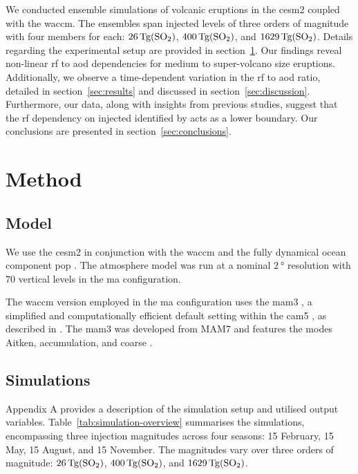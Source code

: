 \documentclass{ametsocV6.1}
\newcommand{\iso}[1][i]{{#1}njected \ce{SO2}}
\begin{document}
We conducted ensemble simulations of volcanic eruptions in the \gls{cesm2} coupled with
the \gls{waccm}. The ensembles span \iso{} levels of three orders of magnitude with four
members for each: \(\SI{26}{\tera\gram(\ce{SO2})}\), \(\SI{400}{\tera\gram(\ce{SO2})}\),
and \(\SI{1629}{\tera\gram(\ce{SO2})}\). Details regarding the experimental setup are
provided in section~\ref{sec:method}. Our findings reveal non-linear \gls{rf} to
\gls{aod} dependencies for medium to super-volcano size eruptions. Additionally, we
observe a time-dependent variation in the \gls{rf} to \gls{aod} ratio, detailed in
section~\ref{sec:results} and discussed in section~\ref{sec:discussion}. Furthermore,
our data, along with insights from previous studies, suggest that the \gls{rf}
dependency on \iso{} identified by \citet{niemeier2015} acts as a lower boundary. Our
conclusions are presented in section~\ref{sec:conclusions}.

\section{Method}\label{sec:method}

\subsection{Model}

We use the \gls{cesm2} \citep{danabasoglu2020} in conjunction with the \gls{waccm}
\citep{gettleman2019} and the fully dynamical ocean component \gls{pop}
\citep{smith2010, danabasoglu2020}. The atmosphere model was run at a nominal
\(\SI{2}{\degree}\) resolution with \(70\) vertical levels in the \gls{ma}
configuration.

The \gls{waccm} version employed in the \gls{ma} configuration uses the \gls{mam3}
\citep{gettleman2019}, a simplified and computationally efficient default setting within
the \gls{cam5} \citep{liu2016}, as described in \citet{liu2012}. The \gls{mam3} was
developed from MAM7 and features the modes Aitken, accumulation, and coarse
\citep{liu2016}.

\subsection{Simulations}

Appendix A provides a description of the simulation setup and utilised output variables.
Table~\ref{tab:simulation-overview} summarises the simulations, encompassing three
 injection magnitudes across four seasons: 15 February, 15 May, 15 August, and
15 November. The magnitudes vary over three orders of magnitude:
\(\SI{26}{\tera\gram(\ce{SO2})}\), \(\SI{400}{\tera\gram(\ce{SO2})}\), and
\(\SI{1629}{\tera\gram(\ce{SO2})}\).
\end{document}
